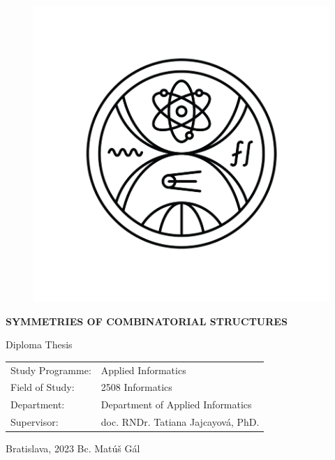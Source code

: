 \documentclass[12pt, a4paper, oneside]{book}
\numberwithin{definition}{chapter}
\numberwithin{theorem}{chapter}
\newcommand\mftitle{Symmetries of Combinatorial Structures}
\newcommand\mfthesistype{Diploma Thesis}
\newcommand\mfauthor{Bc. Matúš Gál}
\newcommand\mfadvisor{doc. RNDr. Tatiana Jajcayová, PhD.}
\newcommand\mfplacedate{Bratislava, 2023}
\begin{document}
\vfill
\begin{figure}[!hbt]
\begin{center}
\includegraphics{images/new_logo}
\end{center}
\end{figure}
\begin{center}
\begin{minipage}{0.8\textwidth}
\centerline{\textbf{\Large\MakeUppercase{\mftitle}}}
\smallskip
\centerline{\mfthesistype}
\end{minipage}
\end{center}
\vfill
\begin{tabular}{l l}
Study Programme: & Applied Informatics \\
Field of Study: & 2508 Informatics \\
Department: & Department of Applied Informatics\\
Supervisor: & \mfadvisor
\end{tabular}
\vfill
\noindent
\mfplacedate \hfill
\mfauthor
\eject


\thispagestyle{empty}
\end{document}
